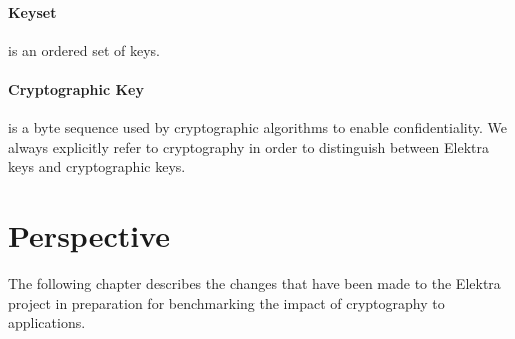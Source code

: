 \paragraph{Keyset} is an ordered set of keys.

\paragraph{Cryptographic Key} is a byte sequence used by cryptographic algorithms to enable confidentiality.
We always explicitly refer to cryptography in order to distinguish between Elektra keys and cryptographic keys.

\section{Perspective}

The following chapter describes the changes that have been made to the Elektra project in preparation for benchmarking the impact of cryptography to applications.

